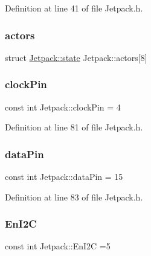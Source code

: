 Definition at line 41 of file Jetpack.\+h.

\mbox{\label{class_jetpack_a7e16d2f97837f9712a2e6de1c50d99db}} 
\subsubsection{\texorpdfstring{actors}{actors}}
{\footnotesize\ttfamily struct \hyperlink{struct_jetpack_1_1state}{Jetpack\+::state} Jetpack\+::actors\mbox{[}8\mbox{]}\hspace{0.3cm}{\ttfamily [private]}}

\mbox{\label{class_jetpack_a58ebb991f358f3ae94e82148b0221b5a}} 
\subsubsection{\texorpdfstring{clock\+Pin}{clockPin}}
{\footnotesize\ttfamily const int Jetpack\+::clock\+Pin = 4\hspace{0.3cm}{\ttfamily [private]}}



Definition at line 81 of file Jetpack.\+h.

\mbox{\label{class_jetpack_a3d669a56e93c71dd25f970d4ed7d0c00}} 
\subsubsection{\texorpdfstring{data\+Pin}{dataPin}}
{\footnotesize\ttfamily const int Jetpack\+::data\+Pin = 15\hspace{0.3cm}{\ttfamily [private]}}



Definition at line 83 of file Jetpack.\+h.

\mbox{\label{class_jetpack_a81df984fb4cea98c71aa1a1cfcdfe814}} 
\subsubsection{\texorpdfstring{En\+I2C}{EnI2C}}
{\footnotesize\ttfamily const int Jetpack\+::\+En\+I2C =5\hspace{0.3cm}{\ttfamily [private]}}



